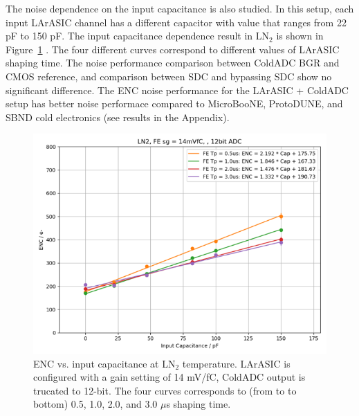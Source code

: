 The noise dependence on the input capacitance is also studied. In this setup, each input LArASIC channel has
a different capacitor with value that ranges from 22 pF to 150 pF. The input capacitance dependence result in 
LN$_2$ is shown in Figure~\ref{fig:noise_capacitance} . The four different curves correspond 
to different values of LArASIC shaping time. 
The noise performance comparison between ColdADC BGR and CMOS reference, and comparison between 
SDC and bypassing SDC show no significant difference.
The ENC noise performance for the LArASIC + ColdADC setup has better noise performace compared to 
MicroBooNE, ProtoDUNE, and SBND cold electronics (see results in the Appendix).
\begin{figure}[h!]
\centering
  \includegraphics[width=0.8\linewidth]{figures/noise_capacitance.png}
  \caption{ENC vs. input capacitance at LN$_2$ temperature. LArASIC is configured with a gain setting of
14 mV/fC, ColdADC output is trucated to 12-bit. The four curves corresponds to (from to to bottom) 0.5, 
1.0, 2.0, and 3.0 $\mu$s shaping time.} 
  \label{fig:noise_capacitance}
\end{figure}


